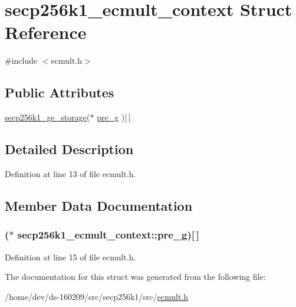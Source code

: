 \hypertarget{structsecp256k1__ecmult__context}{}\section{secp256k1\+\_\+ecmult\+\_\+context Struct Reference}
\label{structsecp256k1__ecmult__context}


{\ttfamily \#include $<$ecmult.\+h$>$}

\subsection*{Public Attributes}
\begin{DoxyCompactItemize}
\item 
\hyperlink{structsecp256k1__ge__storage}{secp256k1\+\_\+ge\+\_\+storage}($\ast$ \hyperlink{structsecp256k1__ecmult__context_ac517c6e7e4f131328f395123fe4cb536}{pre\+\_\+g} )\mbox{[}$\,$\mbox{]}
\end{DoxyCompactItemize}


\subsection{Detailed Description}


Definition at line 13 of file ecmult.\+h.



\subsection{Member Data Documentation}
\hypertarget{structsecp256k1__ecmult__context_ac517c6e7e4f131328f395123fe4cb536}{}
\subsubsection[{pre\+\_\+g}]{($\ast$ secp256k1\+\_\+ecmult\+\_\+context\+::pre\+\_\+g)\mbox{[}$\,$\mbox{]}}\label{structsecp256k1__ecmult__context_ac517c6e7e4f131328f395123fe4cb536}


Definition at line 15 of file ecmult.\+h.



The documentation for this struct was generated from the following file\+:\begin{DoxyCompactItemize}
\item 
/home/dev/ds-\/160209/src/secp256k1/src/\hyperlink{ecmult_8h}{ecmult.\+h}\end{DoxyCompactItemize}
